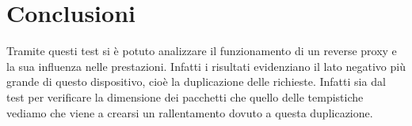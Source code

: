 \section{Conclusioni}
Tramite questi test si è potuto analizzare il funzionamento di un reverse proxy e la sua influenza nelle prestazioni. Infatti i risultati evidenziano il lato negativo più grande di questo dispositivo, cioè la duplicazione delle richieste. Infatti sia dal test per verificare la dimensione dei pacchetti che quello delle tempistiche vediamo che viene a crearsi un rallentamento dovuto a questa duplicazione.
